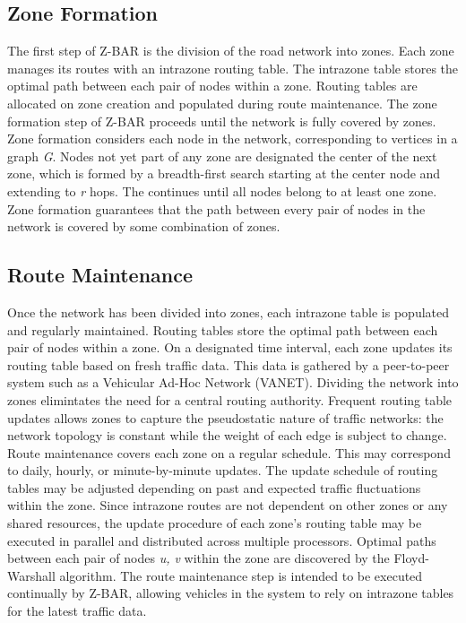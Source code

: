 \documentclass[12pt,conference]{IEEEtran}
\begin{document}
\subsection{Zone Formation}

The first step of Z-BAR is the division of the road network into zones. Each zone manages its routes with an intrazone routing table. The intrazone table stores the optimal path between each pair of nodes within a zone. Routing tables are allocated on zone creation and populated during route maintenance. The zone formation step of Z-BAR proceeds until the network is fully covered by zones. Zone formation considers each node in the network, corresponding to vertices in a graph \textit{G}. Nodes not yet part of any zone are designated the center of the next zone, which is formed by a breadth-first search starting at the center node and extending to \textit{r} hops. The continues until all nodes belong to at least one zone. Zone formation guarantees that the path between every pair of nodes in the network is covered by some combination of zones.

\subsection{Route Maintenance} 

Once the network has been divided into zones, each intrazone table is populated and regularly maintained. Routing tables store the optimal path between each pair of nodes within a zone. On a designated time interval, each zone updates its routing table based on fresh traffic data. This data is gathered by a peer-to-peer system such as a Vehicular Ad-Hoc Network (VANET). Dividing the network into zones elimintates the need for a central routing authority. Frequent routing table updates allows zones to capture the pseudostatic nature of traffic networks: the network topology is constant while the weight of each edge is subject to change. Route maintenance covers each zone on a regular schedule. This may correspond to daily, hourly, or minute-by-minute updates. The update schedule of routing tables may be adjusted depending on past and expected traffic fluctuations within the zone. Since intrazone routes are not dependent on other zones or any shared resources, the update procedure of each zone's routing table may be executed in parallel and distributed across multiple processors. Optimal paths between each pair of nodes \textit{u, v} within the zone are discovered by the Floyd-Warshall algorithm. The route maintenance step is intended to be executed continually by Z-BAR, allowing vehicles in the system to rely on intrazone tables for the latest traffic data.
\end{document}
